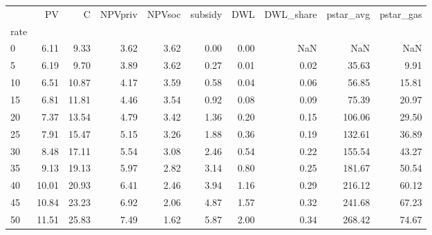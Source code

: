\begin{tabular}{lrrrrrrrrr}
\toprule
 & PV & C & NPVpriv & NPVsoc & subsidy & DWL & DWL_share & pstar_avg & pstar_gas \\
rate &  &  &  &  &  &  &  &  &  \\
\midrule
0 & 6.11 & 9.33 & 3.62 & 3.62 & 0.00 & 0.00 & NaN & NaN & NaN \\
5 & 6.19 & 9.70 & 3.89 & 3.62 & 0.27 & 0.01 & 0.02 & 35.63 & 9.91 \\
10 & 6.51 & 10.87 & 4.17 & 3.59 & 0.58 & 0.04 & 0.06 & 56.85 & 15.81 \\
15 & 6.81 & 11.81 & 4.46 & 3.54 & 0.92 & 0.08 & 0.09 & 75.39 & 20.97 \\
20 & 7.37 & 13.54 & 4.79 & 3.42 & 1.36 & 0.20 & 0.15 & 106.06 & 29.50 \\
25 & 7.91 & 15.47 & 5.15 & 3.26 & 1.88 & 0.36 & 0.19 & 132.61 & 36.89 \\
30 & 8.48 & 17.11 & 5.54 & 3.08 & 2.46 & 0.54 & 0.22 & 155.54 & 43.27 \\
35 & 9.13 & 19.13 & 5.97 & 2.82 & 3.14 & 0.80 & 0.25 & 181.67 & 50.54 \\
40 & 10.01 & 20.93 & 6.41 & 2.46 & 3.94 & 1.16 & 0.29 & 216.12 & 60.12 \\
45 & 10.84 & 23.23 & 6.92 & 2.06 & 4.87 & 1.57 & 0.32 & 241.68 & 67.23 \\
50 & 11.51 & 25.83 & 7.49 & 1.62 & 5.87 & 2.00 & 0.34 & 268.42 & 74.67 \\
\bottomrule
\end{tabular}
